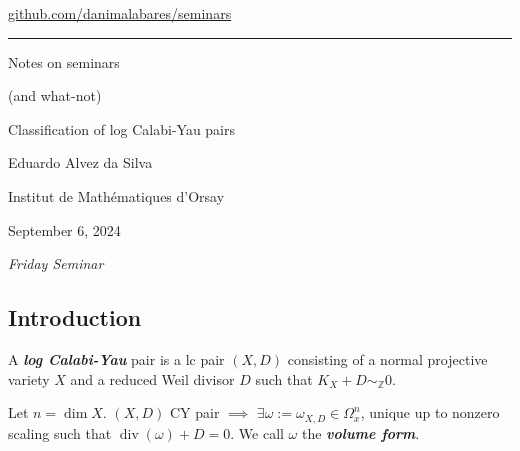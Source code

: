 


\begin{minipage}{\textwidth}
	\begin{minipage}{1\textwidth}
		 \hfill 		
		{\small\hfill\href{https://github.com/danimalabares/seminars}{github.com/danimalabares/seminars}}

		
	\end{minipage}
\end{minipage}\vspace{.2cm}\hrule

{\Huge Notes on seminars}

{\large (and what-not)}
\tableofcontents

\clearpage{}
{\Huge Classification of log Calabi-Yau pairs}

\hfill{\Large Eduardo Alvez da Silva}

{\Large \hfill Institut de Mathématiques d'Orsay}

\hfill{\large September 6, 2024

\hfill \textit{Friday Seminar}}

\subsection{Introduction}


\begin{defn}
	A \textit{\textbf{log Calabi-Yau}} pair is a lc pair  $(X,D)$ consisting of a normal projective variety $X$ and a reduced Weil divisor $D$ such that $K_X+D\sim_{\mathbb{Z}}0$.
\end{defn}

\begin{remark}
	Let $n=\dim X$. $(X,D)$ CY pair $\implies $ $\exists \omega:=\omega_{X,D}\in\Omega^n_x$, unique up to nonzero scaling such that $\operatorname{div}(\omega)+D=0$. We call $\omega$ the \textit{\textbf{volume form}}.
\end{remark}

